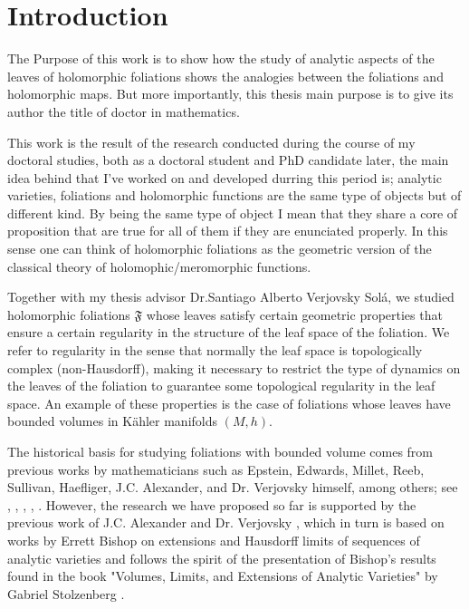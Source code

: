 \documentclass[12pt,twoside,a4paper]{report}
\begin{document}
\tableofcontents %
\listoffigures  %
\listoftables   %


\chapter{Introduction}
\pagestyle{fancy}
\fancyhf{}
\fancyhead[LE]{\rightmark}
\fancyhead[RO]{\leftmark}
\fancyfoot[C]{\thepage}
\noindent The Purpose of this work is to show how the study of analytic aspects of the leaves of holomorphic foliations shows the analogies between the foliations and holomorphic maps. But more importantly, this thesis main purpose is to give its author the title of doctor in mathematics.

This work is the result of the research conducted during the course of my doctoral studies, both as a doctoral student and PhD candidate later, the main idea behind that I've worked on and developed durring this period is; analytic varieties, foliations and holomorphic functions are the same type of objects but of different kind. By being the same type of object I mean that they share a core of proposition that are true for all of them if they are enunciated properly. In this sense one can think of holomorphic foliations as the geometric version of the classical theory of holomophic/meromorphic functions. 

Together with my thesis advisor Dr.Santiago Alberto Verjovsky Solá, we studied holomorphic foliations $\mathfrak{F}$ whose leaves satisfy certain geometric properties that ensure a certain regularity in the structure of the leaf space of the foliation. We refer to regularity in the sense that normally the leaf space is topologically complex (non-Hausdorff), making it necessary to restrict the type of dynamics on the leaves of the foliation to guarantee some topological regularity in the leaf space. An example of these properties is the case of foliations whose leaves have bounded volumes in K\"ahler manifolds $(M,h)$.

The historical basis for studying foliations with bounded volume comes from previous works by mathematicians such as Epstein, Edwards, Millet, Reeb, Sullivan, Haefliger, J.C. Alexander, and Dr. Verjovsky himself, among others; see \cite{EMS}, \cite{V-A}, \cite{E-V}, \cite{Epstein1}, \cite{Epstein2}. However, the research we have proposed so far is supported by the previous work of J.C. Alexander and Dr. Verjovsky \cite{A-V}, which in turn is based on works by Errett Bishop \cite{Bishop} on extensions and Hausdorff limits of sequences of analytic varieties and follows the spirit of the presentation of Bishop's results found in the book "Volumes, Limits, and Extensions of Analytic Varieties" by Gabriel Stolzenberg \cite{Stolzenberg}.
\end{document}
